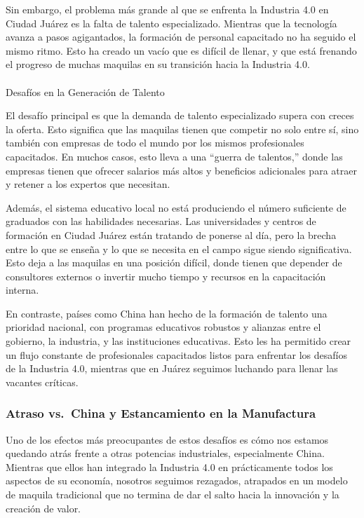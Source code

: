 \documentclass[
  10pt,
  letterpaper,
]{book}
\makeatletter
\let\oldparagraph\paragraph
\renewcommand{\paragraph}{
    \@ifstar
      \xxxParagraphStar
      \xxxParagraphNoStar
  }
\newcommand{\xxxParagraphStar}[1]{\oldparagraph*{#1}\mbox{}}
\newcommand{\xxxParagraphNoStar}[1]{\oldparagraph{#1}\mbox{}}
\makeatother
\begin{document}
Sin embargo, el problema más grande al que se enfrenta la Industria 4.0
en Ciudad Juárez es la falta de talento especializado. Mientras que la
tecnología avanza a pasos agigantados, la formación de personal
capacitado no ha seguido el mismo ritmo. Esto ha creado un vacío que es
difícil de llenar, y que está frenando el progreso de muchas maquilas en
su transición hacia la Industria 4.0.

\paragraph{Desafíos en la Generación de
Talento}\label{desafuxedos-en-la-generaciuxf3n-de-talento}

El desafío principal es que la demanda de talento especializado supera
con creces la oferta. Esto significa que las maquilas tienen que
competir no solo entre sí, sino también con empresas de todo el mundo
por los mismos profesionales capacitados. En muchos casos, esto lleva a
una ``guerra de talentos,'' donde las empresas tienen que ofrecer
salarios más altos y beneficios adicionales para atraer y retener a los
expertos que necesitan.

Además, el sistema educativo local no está produciendo el número
suficiente de graduados con las habilidades necesarias. Las
universidades y centros de formación en Ciudad Juárez están tratando de
ponerse al día, pero la brecha entre lo que se enseña y lo que se
necesita en el campo sigue siendo significativa. Esto deja a las
maquilas en una posición difícil, donde tienen que depender de
consultores externos o invertir mucho tiempo y recursos en la
capacitación interna.

En contraste, países como China han hecho de la formación de talento una
prioridad nacional, con programas educativos robustos y alianzas entre
el gobierno, la industria, y las instituciones educativas. Esto les ha
permitido crear un flujo constante de profesionales capacitados listos
para enfrentar los desafíos de la Industria 4.0, mientras que en Juárez
seguimos luchando para llenar las vacantes críticas.

\subsubsection{Atraso vs.~China y Estancamiento en la
Manufactura}\label{atraso-vs.-china-y-estancamiento-en-la-manufactura}

Uno de los efectos más preocupantes de estos desafíos es cómo nos
estamos quedando atrás frente a otras potencias industriales,
especialmente China. Mientras que ellos han integrado la Industria 4.0
en prácticamente todos los aspectos de su economía, nosotros seguimos
rezagados, atrapados en un modelo de maquila tradicional que no termina
de dar el salto hacia la innovación y la creación de valor.
\end{document}

